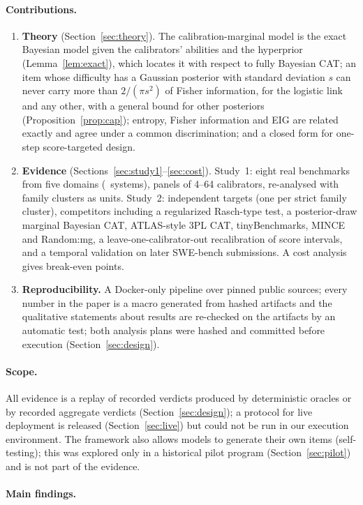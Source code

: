 \paragraph{Contributions.}
\begin{enumerate}\itemsep1pt
\item \textbf{Theory} (Section~\ref{sec:theory}). The calibration-marginal model is the exact
Bayesian model given the calibrators' abilities and the hyperprior (Lemma~\ref{lem:exact}),
which locates it with respect to fully Bayesian CAT; an item whose difficulty has a
Gaussian posterior with standard deviation $s$ can never carry more than $2/(\pi s^2)$ of
Fisher information, for the logistic link and any other, with a general bound for other
posteriors (Proposition~\ref{prop:cap}); entropy, Fisher
information and EIG are related exactly and agree under a common discrimination; and a
closed form for one-step score-targeted design.
\item \textbf{Evidence} (Sections~\ref{sec:study1}--\ref{sec:cost}). Study~1: eight real
benchmarks from five domains (\NSystemsTotal\ systems), panels of 4--64 calibrators,
re-analysed with family clusters as units. Study~2: independent targets (one per strict
family cluster), competitors including a regularized Rasch-type test, a posterior-draw marginal Bayesian
CAT, ATLAS-style 3PL CAT, tinyBenchmarks, MINCE and Random:mg, a leave-one-calibrator-out
recalibration of score intervals, and a temporal validation on later SWE-bench
submissions. A cost analysis gives break-even points.
\item \textbf{Reproducibility.} A Docker-only pipeline over pinned public sources; every
number in the paper is a macro generated from hashed artifacts and the qualitative
statements about results are re-checked on the artifacts by an automatic test; both analysis plans were
hashed and committed before execution (Section~\ref{sec:design}).
\end{enumerate}

\paragraph{Scope.} All evidence is a replay of recorded verdicts produced by deterministic
oracles or by recorded aggregate verdicts (Section~\ref{sec:design}); a protocol for live
deployment is released (Section~\ref{sec:live}) but could not be run in our execution
environment. The framework
also allows models to generate their own items (self-testing); this was explored only in a
historical pilot program (Section~\ref{sec:pilot}) and is not part of the evidence.

\paragraph{Main findings.} \IntroFindings
